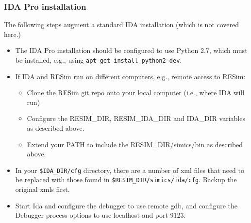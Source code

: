 \documentclass[titlepage]{article}
\begin{document}
\subsubsection{IDA Pro installation}
The following steps augment a standard IDA installation (which is not covered here.)
\begin{itemize}
\item The IDA Pro installation should be configured to use Python 2.7, which must be
installed, e.g., using {\tt apt-get install python2-dev}.
\item If IDA and RESim run on different computers, e.g., remote access to RESim: 
\begin{itemize}
\item Clone the RESim git repo onto your local computer (i.e., where IDA will run)
\item Configure the RESIM\_DIR, RESIM\_IDA\_DIR and
IDA\_DIR variables as described above.  
\item Extend your PATH to include the RESIM\_DIR/simics/bin as described above.
\end{itemize}

\item In your {\tt \$IDA\_DIR/cfg} directory, there are a number of xml files that need to be replaced with those found
in {\tt \$RESIM\_DIR/simics/ida/cfg}.  Backup the original xmls first.

\item Start Ida and configure the debugger to use remote gdb, and configure the Debugger process options to use localhost and port 9123.

\end{itemize}
\end{document}
